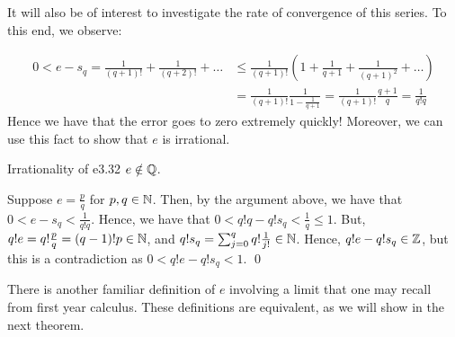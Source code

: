 It will also be of interest to investigate the rate of convergence of this series. To this end, we observe:

\begin{align*}
    0 < e - s_q = \frac{1}{(q+1)!} + \frac{1}{(q+2)!} + \ldots &\leq \frac{1}{(q+1)!}\left(1 + \frac{1}{q+1} + \frac{1}{(q+1)^2} + \ldots \right) 
    \\ &= \frac{1}{(q+1)!}\frac{1}{1-\frac{1}{q+1}} = \frac{1}{(q+1)!}\frac{q+1}{q} = \frac{1}{q!q}
\end{align*}
Hence we have that the error goes to zero extremely quickly! Moreover, we can use this fact to show that $e$ is irrational.

\setcounter{rudin}{31}
\begin{theorem}{Irrationality of e}{3.32}
    $e \notin \mathbb{Q}$.
\end{theorem}
\begin{nproof}
    Suppose $e = \frac{p}{q}$ for $p, q \in \mathbb{N}$. Then, by the argument above, we have that $0 < e - s_q < \frac{1}{q!q}$. Hence, we have that $0 < q! q - q!s_q < \frac{1}{q} \leq 1$. But, $q!e = q!\frac{p}{q} = (q-1)!p \in \mathbb{N}$, and $q!s_q = \sum_{j=0}^q q!\frac{1}{j!} \in \mathbb{N}$. Hence, $q! e - q! s_q \in \mathbb{Z}$, but this is a contradiction as $0 < q! e  - q! s_q < 1$. \qed
\end{nproof}
\noindent There is another familiar definition of $e$ involving a limit that one may recall from first year calculus. These definitions are equivalent, as we will show in the next theorem.

